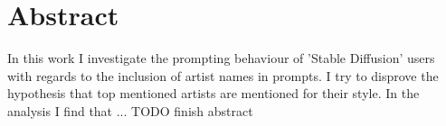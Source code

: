 \section*{Abstract}
\label{sec:Abstract}

In this work I investigate the prompting behaviour of 'Stable Diffusion' users with regards to the inclusion of artist names in prompts. I try to disprove the hypothesis that top mentioned artists are mentioned for their style. In the analysis I find that ...
TODO finish abstract





